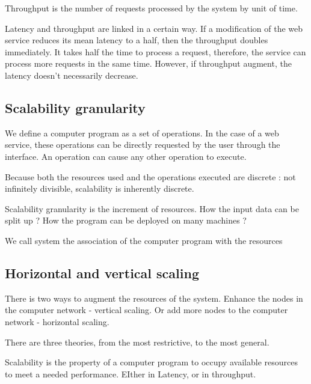 Throughput is the number of requests processed by the system by unit of time.

Latency and throughput are linked in a certain way.
If a modification of the web service reduces its mean latency to a half, then the throughput doubles immediately.
It takes half the time to process a request, therefore, the service can process more requests in the same time.
However, if throughput augment, the latency doesn't necessarily decrease.

\subsection{Scalability granularity}

We define a computer program as a set of operations.
In the case of a web service, these operations can be directly requested by the user through the interface.
An operation can cause any other operation to execute.

Because both the resources used and the operations executed are discrete : not infinitely divisible, scalability is inherently discrete.


Scalability granularity is the increment of resources.
How the input data can be split up ?
How the program can be deployed on many machines ?






We call system the association of the computer program with the resources


\subsection{Horizontal and vertical scaling}

There is two ways to augment the resources of the system.
Enhance the nodes in the computer network - vertical scaling.
Or add more nodes to the computer network - horizontal scaling.



There are three theories, from the most restrictive, to the most general.


Scalability is the property of a computer program to occupy available resources to meet a needed performance.
EIther in Latency, or in throughput.







